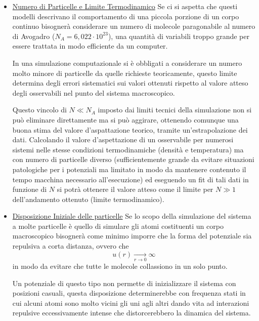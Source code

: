 \documentclass[11pt]{article}
\theoremstyle{plain}
\theoremstyle{remark}
\begin{document}
\begin{itemize}
\item \underline{Numero di Particelle e Limite Termodinamico}\newline
Se ci si aspetta che questi modelli descrivano il comportamento di una piccola porzione di un corpo continuo bisognerà considerare un numero di molecole paragonabile al numero di Avogadro ($N_A = 6,022 \cdot 10^23$), una quantità di variabili troppo grande per essere trattata in modo efficiente da un computer.

In una simulazione computazionale si è obbligati a considerare un numero molto minore di particelle da quelle richieste teoricamente, questo limite determina degli errori sistematici sui valori ottenuti rispetto al valore atteso degli osservabili nel punto del sistema macroscopico.

Questo vincolo di $N\ll N_A$ imposto dai limiti tecnici della simulazione non si può eliminare direttamente ma si può aggirare, ottenendo comunque una buona stima del valore d'aspattazione teorico, tramite un'estrapolazione dei dati.
\newline
Calcolando il valore d'aspettazione di un osservabile per numerosi sistemi nelle stesse condizioni termodinamiche (densità e temperatura) ma con numero di particelle diverso (sufficientemente grande da evitare situazioni patologiche per i potenziali ma limitato in modo da mantenere contenuto il tempo macchina necessario all'esecuzione) ed eseguendo un fit di tali dati in funzione di $N$ si potrà ottenere il valore atteso come il limite per $N\gg 1$ dell'andamento ottenuto (limite termodinamico).


\item \underline{Disposizione Iniziale delle particelle}\newline
Se lo scopo della simulazione del sistema a molte particelle è quello di simulare gli atomi costituenti un corpo macroscopico bisognerà come minimo imporre che la forma del potenziale sia repulsiva a corta distanza, ovvero che
\begin{displaymath}
u(r) \xrightarrow[r \rightarrow 0]{} \infty
\end{displaymath}
in modo da evitare che tutte le molecole collassiono in un solo punto.

Un potenziale di questo tipo non permette di inizializzare il sistema con posizioni casuali, questa disposizione determinerebbe con frequenza stati in cui alcuni atomi sono molto vicini gli uni agli altri dando vita ad interazioni repulsive eccessivamente intense che distorcerebbero la dinamica del sistema.


\end{itemize}
\end{document}
